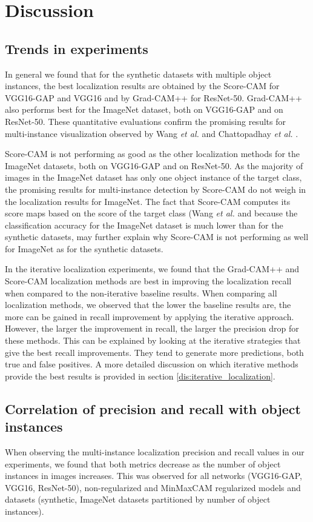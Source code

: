 \chapter{Discussion} \label{ch:discussion}

\section{Trends in experiments} \label{dis:trends_in_experiments}
In general we found that for the synthetic datasets with multiple object instances, the best localization results are obtained by the Score-CAM for VGG16-GAP and VGG16 and by Grad-CAM++ for ResNet-50. Grad-CAM++ also performs best for the ImageNet dataset, both on VGG16-GAP and on ResNet-50. These quantitative evaluations confirm the promising results for multi-instance visualization observed by Wang \textit{et al.} \cite{wang2020score} and Chattopadhay \textit{et al.} \cite{chattopadhay2018grad}.

Score-CAM is not performing as good as the other localization methods for the ImageNet datasets, both on VGG16-GAP and on ResNet-50. As the majority of images in the ImageNet dataset has only one object instance of the target class, the promising results for multi-instance detection by Score-CAM do not weigh in the localization results for ImageNet. The fact that Score-CAM computes its score maps based on the score of the target class (Wang \textit{et al. \cite{wang2020score}} and because the classification accuracy for the ImageNet dataset is much lower than for the synthetic datasets, may further explain why Score-CAM is not performing as well for ImageNet as for the synthetic datasets.

In the iterative localization experiments, we found that the Grad-CAM++ and Score-CAM localization methods are best in improving the localization recall when compared to the non-iterative baseline results. When comparing all localization methods, we observed that the lower the baseline results are, the more can be gained in recall improvement by applying the iterative approach. However, the larger the improvement in recall, the larger the precision drop for these methods. This can be explained by looking at the iterative strategies that give the best recall improvements. They tend to generate more predictions, both true and false positives. A more detailed discussion on which iterative methods provide the best results is provided in section \ref{dis:iterative_localization}.

\section{Correlation of precision and recall with object instances}
When observing the multi-instance localization precision and recall values in our experiments, we found that both metrics decrease as the number of object instances in images increases. This was observed for all networks (VGG16-GAP, VGG16, ResNet-50), non-regularized and MinMaxCAM regularized models and datasets (synthetic, ImageNet datasets partitioned by number of object instances).

